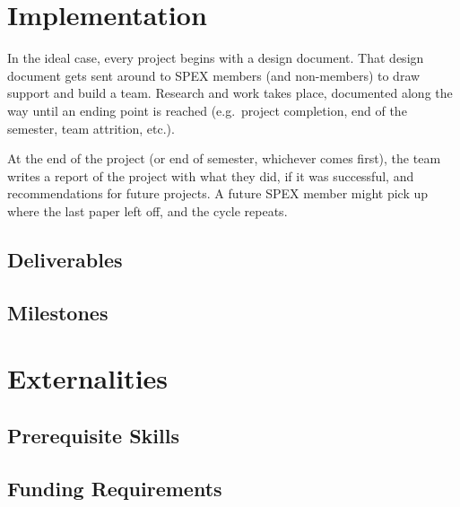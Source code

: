 \documentclass[conference]{IEEEtran} %
\begin{document}
\section{Implementation}
\label{sec:implementation}

In the ideal case, every project begins with a design document.
That design document gets sent around to SPEX members (and non-members) to draw support and build a team.
Research and work takes place, documented along the way until  an ending point is reached (e.g.\ project completion, end of the semester, team attrition, etc.).

At the end of the project (or end of semester, whichever comes first), the team writes a report of the project with what they did, if it was successful, and recommendations for future projects.
A future SPEX member might pick up where the last paper left off, and the cycle repeats.

\subsection{Deliverables}
\label{subsec:deliverables}


\subsection{Milestones}
\label{subsec:milestones}


\section{Externalities}
\subsection{Prerequisite Skills}

\subsection{Funding Requirements}
\end{document}
